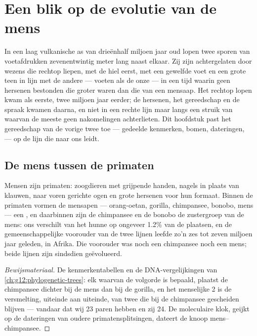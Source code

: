 \chapter{Een blik op de evolutie van de mens}\label{ch:g12:human-evolution}

In een laag vulkanische as van drieënhalf miljoen jaar oud lopen twee
sporen van voetafdrukken zevenentwintig meter lang naast elkaar. Zij zijn
achtergelaten door wezens die rechtop liepen, met de hiel eerst, met een
gewelfde voet en een grote teen in lijn met de andere --- voeten als de
onze --- in een tijd waarin geen hersenen bestonden die groter waren dan
die van een mensaap. Het rechtop lopen kwam als eerste, twee miljoen jaar
eerder; de hersenen, het gereedschap en de spraak kwamen daarna, en niet
in een rechte lijn maar langs een struik van  waarvan de meeste
geen nakomelingen achterlieten. Dit hoofdstuk past het gereedschap van de
vorige twee toe --- gedeelde kenmerken, bomen, dateringen,  --- op de
lijn die naar ons leidt.

\section{De mens tussen de primaten}

\begin{proposition}\label{prop:g12:human-evolution:place}
Mensen zijn primaten: zoogdieren met grijpende handen, nagels in plaats
van klauwen, naar voren gerichte ogen en grote hersenen voor hun formaat.
Binnen de primaten vormen de mensapen --- orang-oetan, gorilla,
chimpansee, bonobo, mens --- een , en daarbinnen zijn de chimpansee
en de bonobo de zustergroep van de mens: ons  verschilt van het hunne
op ongeveer 1.2\% van de plaatsen, en de gemeenschappelijke voorouder van
de twee lijnen leefde zo'n zes tot zeven miljoen jaar geleden, in Afrika.
Die voorouder was noch een chimpansee noch een mens; beide lijnen zijn
sindsdien geëvolueerd.
\end{proposition}
\begin{proof}[Bewijsmateriaal]
De kenmerkentabellen en de DNA-vergelijkingen van
\cref{ch:g12:phylogenetic-trees}: elk  waarvan de volgorde is bepaald,
plaatst de chimpansee dichter bij de mens dan bij de gorilla, en het
menselijke  2 is de versmelting, uiteinde aan uiteinde, van twee
 die bij de chimpansee gescheiden blijven --- vandaar dat wij
23 paren hebben en zij 24. De moleculaire klok, geijkt op de dateringen
van oudere primatensplitsingen, dateert de knoop mens--chimpansee.
\end{proof}

